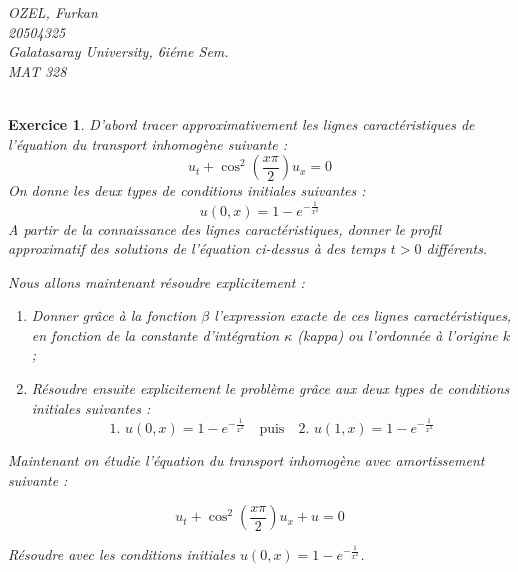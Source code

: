 \documentclass[10pt]{article}
\theoremstyle{frenchstyle}
\newtheorem{exercice}{Exercice}
\begin{document}
\begin{titlepage}
	\vspace*{\fill}
	\begin{minipage}[b]{.4\textwidth}
		\raggedright
		\scriptsize
		\textit{OZEL, Furkan}\\
		\textit{20504325}\\
		\textit{Galatasaray University, 6iéme Sem.}\\
		\textit{MAT 328}\\
		\
	\end{minipage}
\end{titlepage}

\tableofcontents
\newpage

\begin{exercice}
	D'abord tracer approximativement les lignes caractéristiques de l'équation du transport inhomogène suivante :
	\[
		u_t + \cos^2\left(\frac{x\pi}{2}\right)u_x = 0
	\]
	On donne les deux types de conditions initiales suivantes :
	\[u(0,x) = 1-e^{-\frac{1}{x^2}} \]
	A partir de la connaissance des lignes caractéristiques, donner le profil approximatif des solutions de l’équation ci-dessus à des temps $t > 0$ différents.

	Nous allons maintenant résoudre explicitement :
	\begin{enumerate}
		\item Donner grâce à la fonction $\beta$ l’expression exacte de ces lignes caractéristiques, en fonction de la constante d’intégration $\kappa$ (kappa) ou l’ordonnée à l’origine $k$;
		\item Résoudre ensuite explicitement le problème grâce aux deux types de conditions initiales suivantes :
		      \[\text{1. } u(0, x) = 1-e^{-\frac{1}{x^2}} \quad \text{puis} \quad \text{2. } u(1, x) = 1-e^{-\frac{1}{x^2}} \]
	\end{enumerate}

	Maintenant on étudie l’équation du transport inhomogène avec amortissement suivante :

	\[u_t + \cos^2\left(\frac{x\pi}{2}\right)u_x + u=0\]

	Résoudre avec les conditions initiales $u(0,x) = 1-e^{-\frac{1}{x^2}}$.
\end{exercice}
\end{document}
